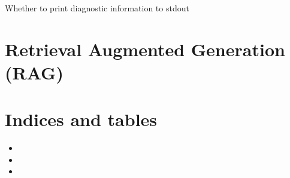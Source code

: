 \documentclass[letterpaper,10pt,english]{sphinxmanual}
\begin{document}
\begin{fulllineitems}
\begin{fulllineitems}
\end{fulllineitems}


\begin{fulllineitems}
\label{\detokenize{filters:filters.string_filter.StringFilter.verbose}}
\pysigstartsignatures
{}
\pysigstopsignatures
\sphinxAtStartPar
Whether to print diagnostic information to stdout

\end{fulllineitems}


\end{fulllineitems}


\sphinxstepscope


\chapter{Retrieval Augmented Generation (RAG)}
\label{\detokenize{retrieval_augmented_generation:retrieval-augmented-generation-rag}}\label{\detokenize{retrieval_augmented_generation::doc}}

\chapter{Indices and tables}
\label{\detokenize{index:indices-and-tables}}\begin{itemize}
\item {} 
\sphinxAtStartPar
{}

\item {} 
\sphinxAtStartPar
{}

\item {} 
\sphinxAtStartPar
{}

\end{itemize}


\renewcommand{\indexname}{Python Module Index}
\begin{sphinxtheindex}
\let\bigletter\sphinxstyleindexlettergroup
\bigletter{f}
\item\relax{}
\end{sphinxtheindex}

\renewcommand{\indexname}{Index}
\printindex
\end{document}
